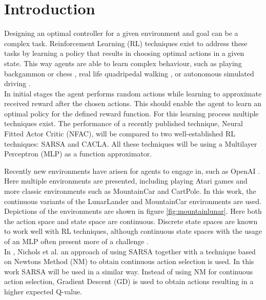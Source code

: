 
\section{Introduction}

Designing an optimal controller for a given environment and goal can be a complex task. Reinforcement Learning (RL) techniques exist to address these tasks by learning a policy that results in choosing optimal actions in a given state. This way agents are able to learn complex behaviour, such as playing backgammon \cite{tesauro2002programming} or chess \cite{baxter1999knightcap},
real life quadripedal walking \cite{kohl2004policy}, or autonomous simulated driving \cite{}. \\  %


In initial stages the agent performs random actions while learning to approximate received reward after the chosen actions. This should enable the agent to learn an optimal policy for the defined reward function. For this learning process multiple techniques exist. The performance of a recently published technique, Neural Fitted Actor Critic (NFAC), will be compared to two well-established RL techniques: SARSA and CACLA. All these techniques will be using a Multilayer Perceptron (MLP) as a function approximator.

Recently new environments have arisen for agents to engage in, such as OpenAI \cite{openaigym}. Here multiple environments are presented, including playing Atari games and more classic environments such as MountainCar and CartPole. In this work, the continuous variants of the LunarLander and MountainCar environments are used. Depictions of the environments are shown in figure \ref{fig:mountainlunar}. Here both the action space and state space are continuous.  Discrete state spaces are known to work well with RL techniques, although continuous state spaces with the usage of an MLP often present more of a challenge \cite{cetina2008multilayer}. \\

In \cite{nichols2015continuous}, Nichols et al. an approach of using SARSA together with a technique based on Newtons Method (NM) to obtain continuous action selection is used. In this work SARSA will be used in a similar way. Instead of using NM for continuous action selection, Gradient Descent (GD) is used to obtain actions resulting in a higher expected Q-value.

